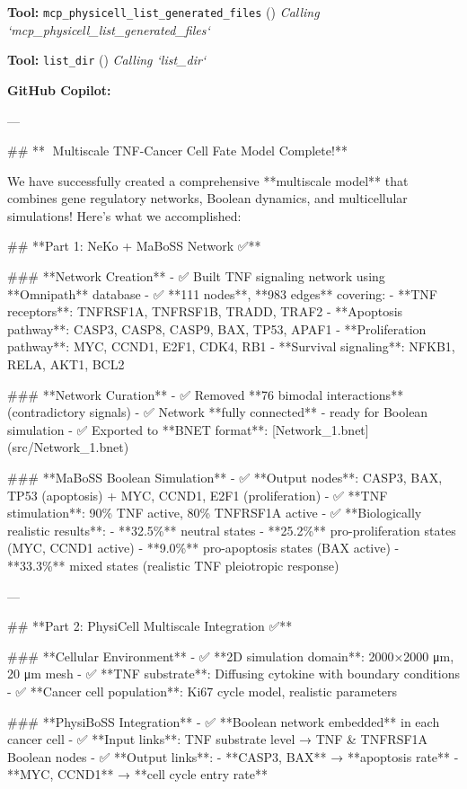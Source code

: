 \documentclass[11pt,a4paper]{article}
\begin{document}
\begin{toolokbox}
\textbf{Tool:} \texttt{mcp\_physicell\_list\_generated\_files} (\checkmark)
\textit{Calling `mcp\_physicell\_list\_generated\_files`}
\end{toolokbox}
\begin{toolokbox}
\textbf{Tool:} \texttt{list\_dir} (\checkmark)
\textit{Calling `list\_dir`}
\end{toolokbox}
\begin{copilotbox}
\textbf{GitHub Copilot:}

---

\#\# **🎉 Multiscale TNF-Cancer Cell Fate Model Complete!**

We have successfully created a comprehensive **multiscale model** that combines gene regulatory networks, Boolean dynamics, and multicellular simulations! Here's what we accomplished:

\#\# **Part 1: NeKo + MaBoSS Network ✅**

\#\#\# **Network Creation**
- ✅ Built TNF signaling network using **Omnipath** database
- ✅ **111 nodes**, **983 edges** covering:
  - **TNF receptors**: TNFRSF1A, TNFRSF1B, TRADD, TRAF2
  - **Apoptosis pathway**: CASP3, CASP8, CASP9, BAX, TP53, APAF1  
  - **Proliferation pathway**: MYC, CCND1, E2F1, CDK4, RB1
  - **Survival signaling**: NFKB1, RELA, AKT1, BCL2

\#\#\# **Network Curation**
- ✅ Removed **76 bimodal interactions** (contradictory signals)
- ✅ Network **fully connected** - ready for Boolean simulation
- ✅ Exported to **BNET format**: [Network\_1.bnet](src/Network\_1.bnet)

\#\#\# **MaBoSS Boolean Simulation**  
- ✅ **Output nodes**: CASP3, BAX, TP53 (apoptosis) + MYC, CCND1, E2F1 (proliferation)
- ✅ **TNF stimulation**: 90\% TNF active, 80\% TNFRSF1A active
- ✅ **Biologically realistic results**:
  - **32.5\%** neutral states  
  - **25.2\%** pro-proliferation states (MYC, CCND1 active)
  - **9.0\%** pro-apoptosis states (BAX active)  
  - **33.3\%** mixed states (realistic TNF pleiotropic response)

---

\#\# **Part 2: PhysiCell Multiscale Integration ✅**

\#\#\# **Cellular Environment**
- ✅ **2D simulation domain**: 2000×2000 μm, 20 μm mesh
- ✅ **TNF substrate**: Diffusing cytokine with boundary conditions
- ✅ **Cancer cell population**: Ki67 cycle model, realistic parameters

\#\#\# **PhysiBoSS Integration**
- ✅ **Boolean network embedded** in each cancer cell
- ✅ **Input links**: TNF substrate level → TNF \& TNFRSF1A Boolean nodes 
- ✅ **Output links**: 
  - **CASP3, BAX** → **apoptosis rate**
  - **MYC, CCND1** → **cell cycle entry rate**


\end{copilotbox}
\end{document}
